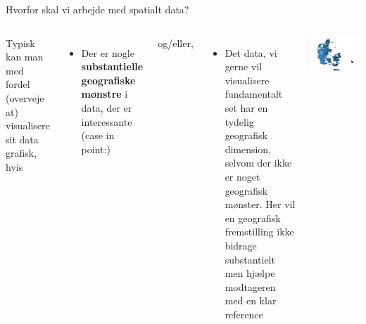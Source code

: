 \documentclass[
  8pt,
  ignorenonframetext,
  aspectratio=169]{beamer}
\providecommand{\tightlist}{%
  \setlength{\itemsep}{0pt}\setlength{\parskip}{0pt}}
\newcommand{\columnsbegin}{\begin{columns}}
\newcommand{\columnsend}{\end{columns}}
\begin{document}
\begin{frame}{Hvorfor skal vi arbejde med spatialt data?}
\protect\hypertarget{hvorfor-skal-vi-arbejde-med-spatialt-data-1}{}
\columnsbegin


Typisk kan man med fordel (overveje at) visualisere sit data grafisk,
hvis

\begin{itemize}
\tightlist
\item
  Der er nogle \textbf{substantielle geografiske mønstre} i data, der er
  interessante (case in point:)
\end{itemize}

og/eller,

\begin{itemize}
\tightlist
\item
  Det data, vi gerne vil visualisere fundamentalt set har en tydelig
  geografisk dimension, selvom der ikke er noget geografisk mønster. Her
  vil en geografisk fremstilling ikke bidrage substantielt men hjælpe
  modtageren med en klar reference
\end{itemize}


\tiny

\includegraphics[width=1\linewidth]{crashcourse_slides_files/figure-beamer/unnamed-chunk-7-1}

\normalsize

\columnsend
\end{frame}
\end{document}
